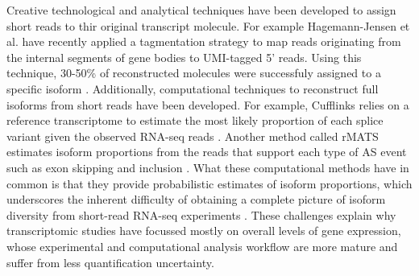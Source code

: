 Creative technological and analytical techniques have been developed to assign short reads to thir original transcript molecule. For example Hagemann-Jensen et al. have recently applied a tagmentation strategy to map reads originating from the internal segments of gene bodies to UMI-tagged 5' reads. Using this technique, 30-50\% of reconstructed molecules were successfuly assigned to a specific isoform \cite{Hagemann-Jensen2020-ob}. Additionally, computational techniques to reconstruct full isoforms from short reads have been developed. For example, Cufflinks relies on a reference transcriptome to estimate the most likely proportion of each splice variant given the observed RNA-seq reads \cite{Trapnell2012-zh}. Another method called rMATS estimates isoform proportions from the reads that support each type of AS event such as exon skipping and inclusion \cite{Shen2014-bq}. What these computational methods have in common is that they provide probabilistic estimates of isoform proportions, which underscores the inherent difficulty of obtaining a complete picture of isoform diversity from short-read RNA-seq experiments \cite{Shen2014-bq,Katz2010-kl}. These challenges explain why transcriptomic studies have focussed mostly on overall levels of gene expression, whose experimental and computational analysis workflow are more mature and suffer from less quantification uncertainty.

